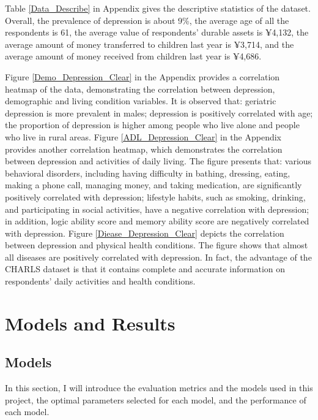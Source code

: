 \documentclass[12pt]{article}
\begin{document}
Table \ref{Data_Describe} in Appendix gives the descriptive statistics of the dataset. Overall, the prevalence of depression is about 9\%, the average age of all the respondents is 61, the average value of respondents’ durable assets is $\yen$4,132, the average amount of money transferred to children last year is $\yen$3,714, and the average amount of money received from children last year is $\yen$4,686.

Figure \ref{Demo_Depression_Clear} in the Appendix provides a correlation heatmap of the data, demonstrating the correlation between depression, demographic and living condition variables. It is observed that: geriatric depression is more prevalent in males; depression is positively correlated with age; the proportion of depression is higher among people who live alone and people who live in rural areas. Figure \ref{ADL_Depression_Clear} in the Appendix provides another correlation heatmap, which demonstrates the correlation between depression and activities of daily living. The figure presents that: various behavioral disorders, including having difficulty in bathing, dressing, eating, making a phone call, managing money, and taking medication, are significantly positively correlated with depression; lifestyle habits, such as smoking, drinking, and participating in social activities, have a negative correlation with depression; in addition, logic ability score and memory ability score are negatively correlated with depression. Figure \ref{Diease_Depression_Clear} depicts the correlation between depression and physical health conditions. The figure shows that almost all diseases are positively correlated with depression. In fact, the advantage of the CHARLS dataset is that it contains complete and accurate information on respondents’ daily activities and health conditions.

\section{Models and Results}
\subsection{Models}
\par In this section, I will introduce the evaluation metrics and the models used in this project, the optimal parameters selected for each model, and the performance of each model.
\end{document}
